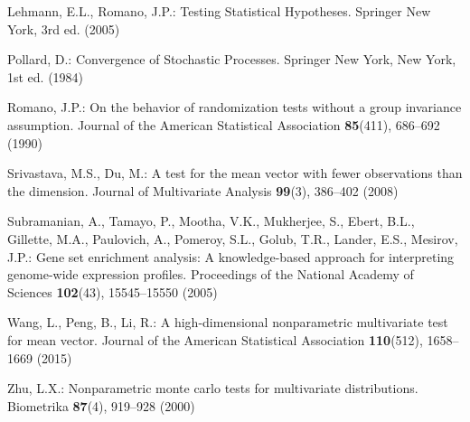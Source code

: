 \documentclass[smallcondensed,final,natbib]{svjour3}          %
\begin{document}
\begin{thebibliography}{16}
Lehmann, E.L., Romano, J.P.: Testing Statistical Hypotheses.
\newblock Springer New York, 3rd ed. (2005)

Pollard, D.: Convergence of Stochastic Processes.
\newblock Springer New York, New York, 1st ed. (1984)

Romano, J.P.: On the behavior of randomization tests without a group invariance
  assumption.
\newblock Journal of the American Statistical Association \textbf{85}(411),
  686--692 (1990)

Srivastava, M.S., Du, M.: A test for the mean vector with fewer observations
  than the dimension.
\newblock Journal of Multivariate Analysis \textbf{99}(3), 386--402 (2008)

Subramanian, A., Tamayo, P., Mootha, V.K., Mukherjee, S., Ebert, B.L.,
  Gillette, M.A., Paulovich, A., Pomeroy, S.L., Golub, T.R., Lander, E.S.,
  Mesirov, J.P.: Gene set enrichment analysis: A knowledge-based approach for
  interpreting genome-wide expression profiles.
\newblock Proceedings of the National Academy of Sciences \textbf{102}(43),
  15545--15550 (2005)

Wang, L., Peng, B., Li, R.: A high-dimensional nonparametric multivariate test
  for mean vector.
\newblock Journal of the American Statistical Association \textbf{110}(512),
  1658--1669 (2015)

Zhu, L.X.: Nonparametric monte carlo tests for multivariate distributions.
\newblock Biometrika \textbf{87}(4), 919--928 (2000)

\end{thebibliography}
\end{document}
